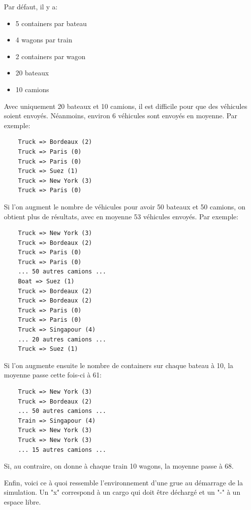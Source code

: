 \documentclass[12pt]{article}
\begin{document}
Par défaut, il y a:

\begin{itemize}
    \item 5 containers par bateau
    \item 4 wagons par train
    \item 2 containers par wagon
    \item 20 bateaux
    \item 10 camions
\end{itemize}

Avec uniquement 20 bateaux et 10 camions, il est difficile pour que des véhicules soient envoyés.
Néanmoins, environ 6 véhicules sont envoyés en moyenne. Par exemple:

\begin{lstlisting}
    Truck => Bordeaux (2)
    Truck => Paris (0)
    Truck => Paris (0)
    Truck => Suez (1)
    Truck => New York (3)
    Truck => Paris (0)
\end{lstlisting}

Si l'on augment le nombre de véhicules pour avoir 50 bateaux et 50 camions, on obtient plus de résultats, avec en moyenne 53 véhicules envoyés. Par exemple:

\begin{lstlisting}
    Truck => New York (3)
    Truck => Bordeaux (2)
    Truck => Paris (0)
    Truck => Paris (0)
    ... 50 autres camions ...
    Boat => Suez (1)
    Truck => Bordeaux (2)
    Truck => Bordeaux (2)
    Truck => Paris (0)
    Truck => Paris (0)
    Truck => Singapour (4)
    ... 20 autres camions ...
    Truck => Suez (1)
\end{lstlisting}

Si l'on augmente ensuite le nombre de containers sur chaque bateau à 10, la moyenne passe cette fois-ci à 61:

\begin{lstlisting}
    Truck => New York (3)
    Truck => Bordeaux (2)
    ... 50 autres camions ...
    Train => Singapour (4)
    Truck => New York (3)
    Truck => New York (3)
    ... 15 autres camions ...
\end{lstlisting}

Si, au contraire, on donne à chaque train 10 wagons, la moyenne passe à 68.

Enfin, voici ce à quoi ressemble l'environnement d'une grue au démarrage de la simulation. Un "x" correspond à un cargo qui doit être déchargé et un "-" à un espace libre.
\end{document}
